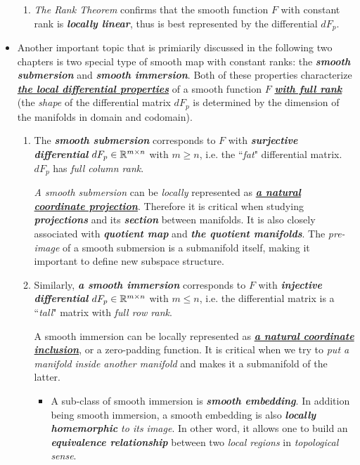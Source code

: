 \documentclass[11pt]{article}
\begin{document}
\begin{itemize}
\begin{remark}
\begin{enumerate}
\item \emph{The Rank Theorem} confirms that the smooth function $F$ with constant rank is \emph{\textbf{locally linear}}, thus is best represented by the differential $dF_p$.
\end{enumerate}
\end{remark}

\item  \begin{remark}
 Another important topic that is primiarily discussed in the following two chapters is two special type of smooth map with constant ranks: the  \emph{\textbf{smooth submersion}} and  \emph{\textbf{smooth immersion}}. Both of these properties characterize \underline{\emph{\textbf{the local differential properties}}} of a smooth function $F$ \underline{\emph{\textbf{with full rank}}} (the \emph{shape} of the differential matrix $dF_p$ is determined by the dimension of the manifolds in domain and codomain).
\begin{enumerate}
\item The  \emph{\textbf{smooth submersion}} corresponds to $F$ with \emph{\textbf{surjective differential}} $dF_p \in {\mathbb R}^{m \times n}$ with $m \ge n$, i.e. the ``\emph{fat}" differential matrix. $dF_p$ has \emph{full column rank}. 

\emph{A smooth submersion} can be \emph{locally} represented as \underline{\emph{\textbf{a natural coordinate projection}}}. Therefore it is critical when studying \emph{\textbf{projections}} and its \emph{\textbf{section}} between manifolds. It is also closely associated with \emph{\textbf{quotient map}} and \emph{\textbf{the quotient manifolds}}.  The \emph{pre-image} of a smooth submersion is a submanifold itself, making it important to define new subspace structure. 

\item Similarly, \emph{\textbf{a smooth immersion}} corresponds to $F$ with \emph{\textbf{injective differential}} $dF_p \in {\mathbb R}^{m \times n}$ with $m \le n$, i.e. the differential matrix is a ``\emph{tall}" matrix with \emph{full row rank}. 

A smooth immersion can be locally represented as \underline{\emph{\textbf{a natural coordinate inclusion}}}, or a zero-padding function. It is critical when we try to \emph{put a manifold inside another manifold} and makes it a submanifold of the latter. 

\begin{itemize}
\item A sub-class of smooth immersion is \emph{\textbf{smooth embedding}}. In addition being smooth immersion, a smooth embedding is also \emph{\textbf{locally homemorphic} to its image}. In other word, it allows one to build an \emph{\textbf{equivalence relationship}} between two \emph{local regions}  in \emph{topological sense}. 


\end{itemize}
\end{enumerate}
\end{remark}
\end{itemize}
\end{document}
